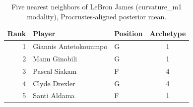 \begin{table}[htbp]
  \centering\small
  \begin{tabular}{rllc}
    \toprule
    Rank & Player & Position & Archetype \\
    \midrule
    1 & Giannis Antetokounmpo & G & 1 \\
    2 & Manu Ginobili & G & 1 \\
    3 & Pascal Siakam & F & 4 \\
    4 & Clyde Drexler & G & 4 \\
    5 & Santi Aldama & F & 1 \\
    \bottomrule
  \end{tabular}
  \caption{Five nearest neighbors of LeBron James (curvature_m1 modality), Procrustes-aligned posterior mean.}
  \label{tab:LeBron_James_neighbors_curvature_m1}
\end{table}

